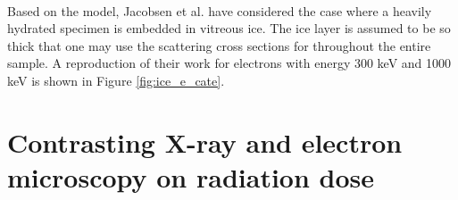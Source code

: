 \documentclass[]{article}
\begin{document}
\paragraph{} Based on the model, Jacobsen et al. \cite{Jacobsen:1998vj} have considered the case where a heavily hydrated specimen is embedded in vitreous ice. The ice layer is assumed to be so thick that one may use the scattering cross sections for  throughout the entire sample. A reproduction of their work for electrons with energy 300 keV and 1000 keV is shown in Figure \ref{fig:ice_e_cate}. 

\section{Contrasting X-ray and electron microscopy on radiation dose}
\end{document}
